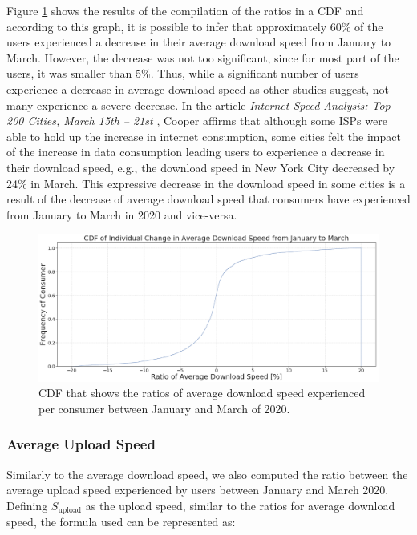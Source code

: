 \documentclass[conference,10pt]{IEEEtran}
\begin{document}
Figure \ref{fig:downloadspeed2020} shows the results of the compilation of the ratios in a CDF and according to this graph, it is possible to infer that approximately 60\% of the users experienced a decrease in their average download speed from January to March. However, the decrease was not too significant, since for most part of the users, it was smaller than 5\%. Thus, while a significant number of users experience a decrease in average download speed as other studies suggest, not many experience a severe decrease. In the article \textit{Internet Speed Analysis: Top 200 Cities, March 15th – 21st} \cite{cooper}, Cooper affirms that although some ISPs were able to hold up the increase in  internet consumption, some cities felt the impact of the increase in data consumption leading users to experience a decrease in their download speed, e.g., the download speed in New York City decreased by 24\% in March. This expressive decrease in the download speed in some cities is a result of the decrease of average download speed that consumers have experienced from January to March in 2020 and vice-versa.

\begin{figure}
\centering
\includegraphics[width=1.0\linewidth]{figs/downspeed.PNG}
\caption{CDF that shows the ratios of average download speed experienced per consumer between January and March of 2020.}
\label{fig:downloadspeed2020}
\end{figure}

\subsubsection{Average Upload Speed}
\label{sec:average-upload-speed}
Similarly to the average download speed, we also computed the ratio between the average upload speed experienced by users between January and March 2020. Defining $S_{\text{upload}}$ as the upload speed, similar to the ratios for average download speed, the formula used can be represented as:
\end{document}
